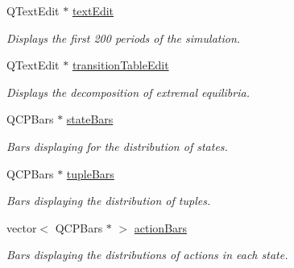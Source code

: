 \begin{DoxyCompactItemize}
\mbox{\label{classSGSimulationHandler_a3f1eaed863efcd76303c7b1cc45ca666}} 
Q\+Text\+Edit $\ast$ \hyperlink{classSGSimulationHandler_a3f1eaed863efcd76303c7b1cc45ca666}{text\+Edit}
\begin{DoxyCompactList}\small\item\em Displays the first 200 periods of the simulation. \end{DoxyCompactList}\item 
\mbox{\label{classSGSimulationHandler_a82b37828124dadacb81fdc7aa6a3b435}} 
Q\+Text\+Edit $\ast$ \hyperlink{classSGSimulationHandler_a82b37828124dadacb81fdc7aa6a3b435}{transition\+Table\+Edit}
\begin{DoxyCompactList}\small\item\em Displays the decomposition of extremal equilibria. \end{DoxyCompactList}\item 
\mbox{\label{classSGSimulationHandler_a909f0362d60b51f701ff89f67d9924f3}} 
Q\+C\+P\+Bars $\ast$ \hyperlink{classSGSimulationHandler_a909f0362d60b51f701ff89f67d9924f3}{state\+Bars}
\begin{DoxyCompactList}\small\item\em Bars displaying for the distribution of states. \end{DoxyCompactList}\item 
\mbox{\label{classSGSimulationHandler_ac2c24b41887a4522e21f6fe441a814ae}} 
Q\+C\+P\+Bars $\ast$ \hyperlink{classSGSimulationHandler_ac2c24b41887a4522e21f6fe441a814ae}{tuple\+Bars}
\begin{DoxyCompactList}\small\item\em Bars displaying the distribution of tuples. \end{DoxyCompactList}\item 
\mbox{\label{classSGSimulationHandler_ad1b07f72d1a78e159b3f83bbf5d7945e}} 
vector$<$ Q\+C\+P\+Bars $\ast$ $>$ \hyperlink{classSGSimulationHandler_ad1b07f72d1a78e159b3f83bbf5d7945e}{action\+Bars}
\begin{DoxyCompactList}\small\item\em Bars displaying the distributions of actions in each state. \end{DoxyCompactList}\item 

\end{DoxyCompactItemize}
